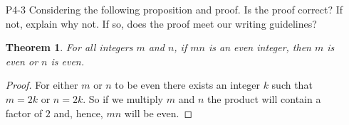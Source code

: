 \documentclass[11pt]{article}
\newtheorem*{theorem}{Theorem}
\begin{document}
\begin{itemize}
\begin{enumerate}
\begin{proof}
	Since we've proven that  $3\mid n^2+2$ in all possible cases we have completed the proof.
	\end{proof}
	\end{enumerate}
	

\item[P4-3]  Considering the following proposition and proof. Is the proof correct? If not, explain why not. If so, does the proof meet our writing guidelines?

	\begin{theorem}
	For all integers $m$ and $n$, if $mn$ is an even integer, then $m$ is even or $n$ is even.
	\end{theorem}
	\begin{proof}
	For either $m$ or $n$ to be even there exists an integer $k$ such that $m=2k$ or $n=2k$. So if we multiply $m$ and $n$ the product will contain a factor of $2$ and, hence, $mn$ will be even.
	\end{proof}
	
\end{itemize}

\newpage
\end{document}
